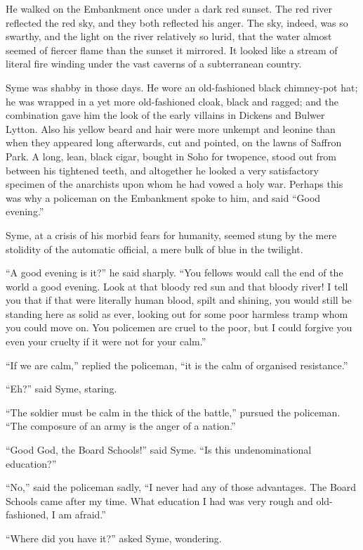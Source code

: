 He walked on the Embankment once under a dark red sunset. The red river reflected the red sky, and they both reflected his anger. The sky, indeed, was so swarthy, and the light on the river relatively so lurid, that the water almost seemed of fiercer flame than the sunset it mirrored. It looked like a stream of literal fire winding under the vast caverns of a subterranean country.

Syme was shabby in those days. He wore an old-fashioned black chimney-pot hat; he was wrapped in a yet more old-fashioned cloak, black and ragged; and the combination gave him the look of the early villains in Dickens and Bulwer Lytton. Also his yellow beard and hair were more unkempt and leonine than when they appeared long afterwards, cut and pointed, on the lawns of Saffron Park. A long, lean, black cigar, bought in Soho for twopence, stood out from between his tightened teeth, and altogether he looked a very satisfactory specimen of the anarchists upon whom he had vowed a holy war. Perhaps this was why a policeman on the Embankment spoke to him, and said “Good evening.”

Syme, at a crisis of his morbid fears for humanity, seemed stung by the mere stolidity of the automatic official, a mere bulk of blue in the twilight.

“A good evening is it?” he said sharply. “You fellows would call the end of the world a good evening. Look at that bloody red sun and that bloody river! I tell you that if that were literally human blood, spilt and shining, you would still be standing here as solid as ever, looking out for some poor harmless tramp whom you could move on. You policemen are cruel to the poor, but I could forgive you even your cruelty if it were not for your calm.”

“If we are calm,” replied the policeman, “it is the calm of organised resistance.”

“Eh?” said Syme, staring.

“The soldier must be calm in the thick of the battle,” pursued the policeman. “The composure of an army is the anger of a nation.”

“Good God, the Board Schools!” said Syme. “Is this undenominational education?”

“No,” said the policeman sadly, “I never had any of those advantages. The Board Schools came after my time. What education I had was very rough and old-fashioned, I am afraid.”

“Where did you have it?” asked Syme, wondering.


